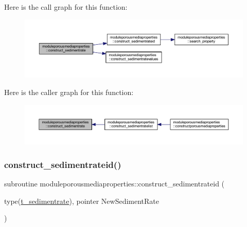 Here is the call graph for this function\+:\nopagebreak
\begin{figure}[H]
\begin{center}
\leavevmode
\includegraphics[width=350pt]{namespacemoduleporousmediaproperties_abfc3b112a762e28d4f711dfe4a5d7d3d_cgraph}
\end{center}
\end{figure}
Here is the caller graph for this function\+:\nopagebreak
\begin{figure}[H]
\begin{center}
\leavevmode
\includegraphics[width=350pt]{namespacemoduleporousmediaproperties_abfc3b112a762e28d4f711dfe4a5d7d3d_icgraph}
\end{center}
\end{figure}
\mbox{\label{namespacemoduleporousmediaproperties_a4bcf212cc66413ac54a86d6f71dab6d6}} 
\subsubsection{\texorpdfstring{construct\+\_\+sedimentrateid()}{construct\_sedimentrateid()}}
{\footnotesize\ttfamily subroutine moduleporousmediaproperties\+::construct\+\_\+sedimentrateid (\begin{DoxyParamCaption}\item[{type(\mbox{\hyperlink{structmoduleporousmediaproperties_1_1t__sedimentrate}{t\+\_\+sedimentrate}}), pointer}]{New\+Sediment\+Rate }\end{DoxyParamCaption})\hspace{0.3cm}{\ttfamily [private]}}


